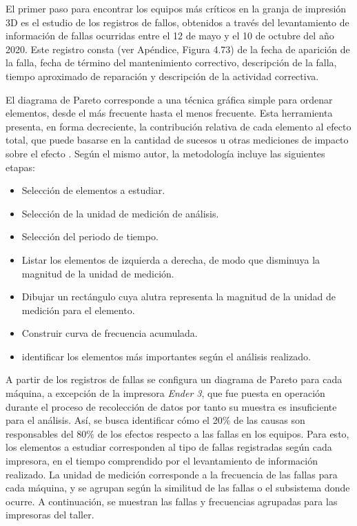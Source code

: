 El primer paso para encontrar los equipos más críticos en la granja de impresión 3D es el estudio de los registros de fallos, obtenidos a través del levantamiento de información de fallas ocurridas entre el 12 de mayo y el 10 de octubre del año 2020. Este registro consta (ver Apéndice, Figura 4.73)  de la fecha de aparición de la falla, fecha de término del mantenimiento correctivo, descripción de la falla, tiempo aproximado de reparación y descripción de la actividad correctiva. 
 
El diagrama de Pareto corresponde a una técnica gráfica simple para ordenar elementos, desde el más frecuente hasta el menos frecuente. Esta herramienta presenta, en forma decreciente, la contribución relativa de cada elemento al efecto total, que puede basarse en la cantidad de sucesos u otras mediciones de impacto sobre el efecto \parencite{unit2009}. Según el mismo autor, la metodología incluye las siguientes etapas:

\begin{itemize}
\item Selección de elementos a estudiar.
\item Selección de la unidad de medición de análisis.
\item Selección del periodo de tiempo.
\item Listar los elementos de izquierda a derecha, de modo que disminuya la magnitud de la unidad de medición.
\item Dibujar un rectángulo cuya alutra representa la magnitud de la unidad de medición para el elemento.
\item Construir curva de frecuencia acumulada.
\item identificar los elementos más importantes según el análisis realizado.
\end{itemize}


A partir de los registros de fallas se configura un diagrama de Pareto para cada máquina, a excepción de la impresora \textit{Ender 3}, que fue puesta en operación durante el proceso de recolección de datos por tanto su muestra es insuficiente para el análisis. Así, se busca identificar cómo el 20\% de las causas son responsables del 80\% de los efectos respecto a las fallas en los equipos. Para esto, los elementos a estudiar corresponden al tipo de fallas registradas según cada impresora, en el tiempo comprendido por el levantamiento de información realizado. La unidad de medición corresponde a la frecuencia de las fallas para cada máquina, y se agrupan según la similitud de las fallas o el subsistema donde ocurre. A continuación, se muestran las fallas y frecuencias agrupadas para las impresoras del taller.

